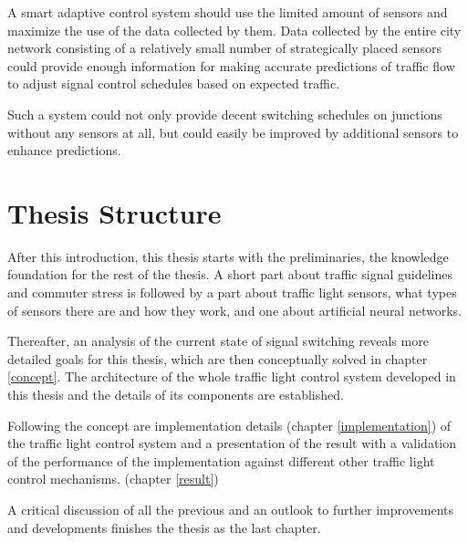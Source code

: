 A smart adaptive control system should use the limited amount of sensors and maximize the use of the data collected by them. Data collected by the entire city network consisting of a relatively small number of strategically placed sensors could provide enough information for making accurate predictions of traffic flow to adjust signal control schedules based on expected traffic.

Such a system could not only provide decent switching schedules on junctions without any sensors at all, but could easily be improved by additional sensors to enhance predictions.

\newpage

\section{Thesis Structure}

After this introduction, this thesis starts with the preliminaries, the knowledge foundation for the rest of the thesis. A short part about traffic signal guidelines and commuter stress is followed by a part about traffic light sensors, what types of sensors there are and how they work, and one about artificial neural networks.

Thereafter, an analysis of the current state of signal switching reveals more detailed goals for this thesis, which are then conceptually solved in chapter \ref{concept}. The architecture of the whole traffic light control system developed in this thesis and the details of its components are established.

Following the concept are implementation details (chapter \ref{implementation}) of the traffic light control system and a presentation of the result with a validation of the performance of the implementation against different other traffic light control mechanisms. (chapter \ref{result})

A critical discussion of all the previous and an outlook to further improvements and developments finishes the thesis as the last chapter.